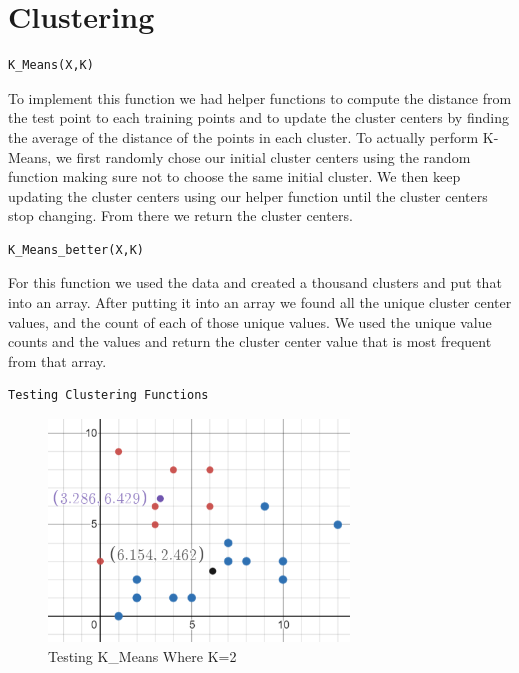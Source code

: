 \documentclass[12pt,letterpaper]{article}
\begin{document}
\section*{Clustering}
    
    \begin{lstlisting}[style = Python]
    K_Means(X,K)
    \end{lstlisting}
    
    \begin{flushleft}To implement this function we had helper functions to compute the distance from the test point to each training points and to update the cluster centers by finding the average of the distance of the points in each cluster. To actually perform K-Means, we first randomly chose our initial cluster centers using the random function making sure not to choose the same initial cluster. We then keep updating the cluster centers using our helper function until the cluster centers stop changing. From there we return the cluster centers.
    \end{flushleft}
    
    \begin{lstlisting}[style = Python]
    K_Means_better(X,K)
    \end{lstlisting}
    
        \begin{flushleft} For this function we used the data and created a thousand clusters and put that into an array. After putting it into an array we found all the unique cluster center values, and the count of each of those unique values. We used the unique value counts and the values and return the cluster center value that is most frequent from that array. 
    \end{flushleft}
    
    \begin{lstlisting}[style = Python]
    Testing Clustering Functions
    \end{lstlisting}
    
    \begin{figure}[htp]
        \centering
        \includegraphics[width=8cm]{cluster2.PNG}
        \caption{Testing K\_Means Where K=2}
        \label{fig:cluster2}
    \end{figure}
    
\end{document}
